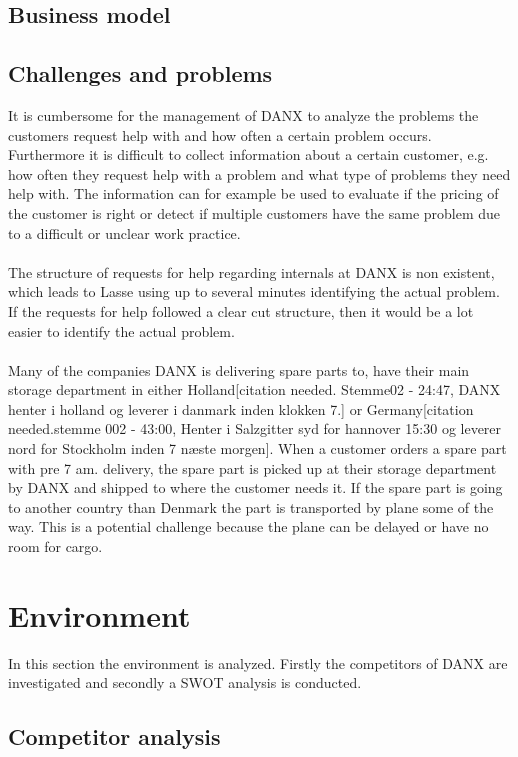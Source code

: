 \subsection{Business model}

\subsection{Challenges and problems}
It is cumbersome for the management of DANX to analyze the problems the customers request help with and how often a certain problem occurs. Furthermore it is difficult to collect information about a certain customer, e.g. how often they request help with a problem and what type of problems they need help with. The information can for example be used to evaluate if the pricing of the customer is right or detect if multiple customers have the same problem due to a difficult or unclear work practice. \\ \\

The structure of requests for help regarding internals at DANX is non existent, which leads to Lasse using up to several minutes identifying the actual problem. If the requests for help followed a clear cut structure, then it would be a lot easier to identify the actual problem. \\ \\

Many of the companies DANX is delivering spare parts to, have their main storage department in either Holland\cite{gert001}[citation needed. Stemme02 - 24:47, DANX henter i holland og leverer i danmark inden klokken 7.] or Germany\cite{gert002}[citation needed.stemme 002 - 43:00, Henter i Salzgitter syd for hannover 15:30 og leverer nord for Stockholm inden 7 næste morgen]. When a customer orders a spare part with pre 7 am. delivery, the spare part is picked up at their storage department by DANX and shipped to where the customer needs it. If the spare part is going to another country than Denmark the part is transported by plane some of the way. This is a potential challenge because the plane can be delayed or have no room for cargo.
\section*{Environment}
In this section the environment is analyzed. Firstly the competitors of DANX are investigated and secondly a SWOT analysis is conducted.	
\subsection{Competitor analysis}
